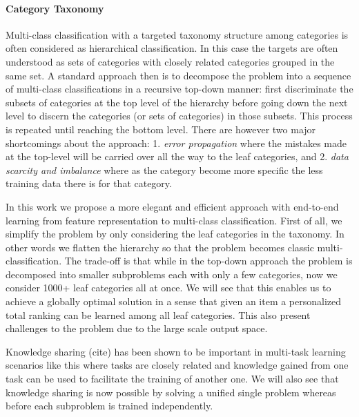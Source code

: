 \paragraph{Category Taxonomy}
Multi-class classification with a targeted taxonomy structure among categories is often considered as hierarchical classification. In this case the targets are often understood as sets of categories with closely related categories grouped in the same set. A standard approach then is to decompose the problem into a sequence of multi-class classifications in a recursive top-down manner: 
first discriminate the subsets of categories at the top level of the hierarchy before going down the next level to discern the categories (or sets of categories) in those subsets. This process is repeated until reaching the bottom level.  
There are however two major shortcomings about the approach: 1. \emph{error propagation} where the mistakes made at the top-level will be carried over all the way to the leaf categories, and 2. \emph{data scarcity and imbalance} where as the category become more specific the less training data there is for that category. 

In this work we propose a more elegant and efficient approach with end-to-end learning from feature representation to multi-class classification. First of all, we simplify the problem by only considering the leaf categories in the taxonomy. In other words we flatten the hierarchy so that the problem becomes classic multi-classification. 
The trade-off is that while in the top-down approach the problem is decomposed into smaller subproblems each with only a few categories, now we consider 1000+ leaf categories all at once. We will see that this enables us to achieve a globally optimal solution in a sense that given an item a personalized total ranking can be learned among all leaf categories. This also present challenges to the problem due to the large scale output space. 

Knowledge sharing (cite) has been shown to be important in multi-task learning scenarios like this where tasks are closely related and knowledge gained from one task can be used to facilitate the training of another one. 
We will also see that knowledge sharing is now possible by solving a unified single problem whereas before each subproblem is trained independently. 


